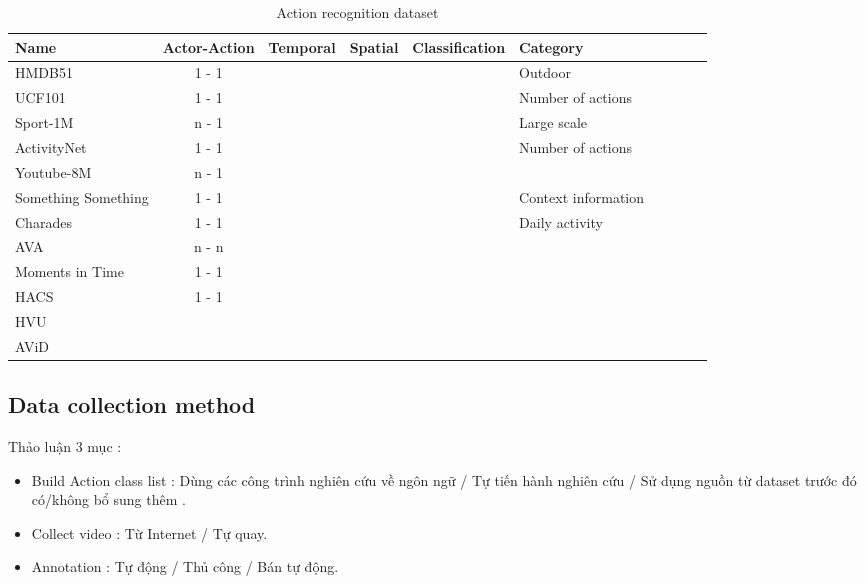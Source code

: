 \documentclass[a4paper]{article}
\begin{document}
\begin{table}[h]
	\centering
	\caption{Action recognition dataset}
	\renewcommand{\arraystretch}{1.5}
	\begin{tabular}{l|c c c c l l l l l}
		\toprule
		Name & Actor-Action & Temporal & Spatial & Classification & Category \\
		\hline
		HMDB51               & 1 - 1 & \xmark & \xmark & \cmark & Outdoor \\
		UCF101               & 1 - 1 & \xmark & \xmark & \cmark & Number of actions \\
		Sport-1M             & n - 1 & \xmark & \xmark & \cmark & Large scale \\
		ActivityNet          & 1 - 1 & \cmark & \xmark & \xmark & Number of actions \\ 
		Youtube-8M           & n - 1 & \\
		Something Something  & 1 - 1 & \xmark & \xmark & \cmark & Context information \\
		Charades             & 1 - 1 & \cmark & \xmark & \xmark & Daily activity \\
		AVA                  & n - n & \cmark & \cmark & \xmark & \\
		Moments in Time      & 1 - 1 & \xmark & \xmark & \cmark & \\
		HACS                 & 1 - 1 & \cmark & \xmark & \cmark & \\
		HVU                  &       & \xmark & \xmark & \cmark & \\
		AViD                 &       & \xmark & \xmark & \cmark & \\
		\bottomrule
 		
	\end{tabular}%
	\label{config1}
\end{table}%

\subsection{Data collection method}
Thảo luận 3 mục : 
\begin{itemize}
	\item Build Action class list : Dùng các công trình nghiên cứu về ngôn ngữ / Tự tiến hành nghiên cứu / Sử dụng nguồn từ dataset trước đó có/không bổ sung thêm .
	\item Collect video : Từ Internet / Tự quay.
	\item Annotation : Tự động / Thủ công / Bán tự động.
\end{itemize}
\end{document}
